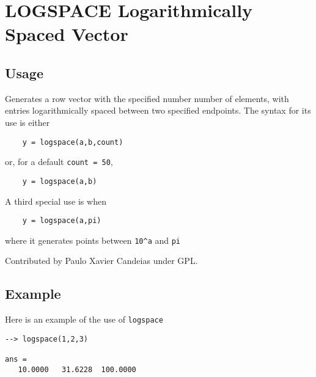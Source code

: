 \section{LOGSPACE Logarithmically Spaced Vector}

\subsection{Usage}

Generates a row vector with the specified number number of elements,
with entries logarithmically spaced between two specified endpoints.
The syntax for its use is either
\begin{verbatim}
    y = logspace(a,b,count)
\end{verbatim}
 or, for a default \verb|count = 50|,
\begin{verbatim}
    y = logspace(a,b)
\end{verbatim}
 A third special use is when
\begin{verbatim}
    y = logspace(a,pi)
\end{verbatim}
where it generates points between \verb|10^a| and \verb|pi|

Contributed by Paulo Xavier Candeias under GPL.
\subsection{Example}

Here is an example of the use of \verb|logspace|
\begin{verbatim}
--> logspace(1,2,3)

ans = 
   10.0000   31.6228  100.0000 
\end{verbatim}
